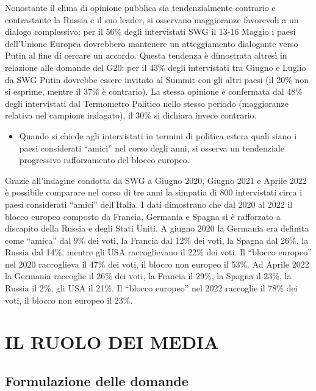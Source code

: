 \documentclass[
]{book}
\providecommand{\tightlist}{%
  \setlength{\itemsep}{0pt}\setlength{\parskip}{0pt}}
\begin{document}
Nonostante il clima di opinione pubblica sia tendenzialmente contrario e contrastante la Russia e il suo leader, si osservano maggioranze favorevoli a un dialogo complessivo: per il 56\% degli intervistati SWG il 13-16 Maggio i paesi dell'Unione Europea dovrebbero mantenere un atteggiamento dialogante verso Putin al fine di cercare un accordo.
Questa tendenza è dimostrata altresì in relazione alle domande del G20: per il 43\% degli intervistati tra Giugno e Luglio da SWG Putin dovrebbe essere invitato al Summit con gli altri paesi (il 20\% non si esprime, mentre il 37\% è contrario). La stessa opinione è confermata dal 48\% degli intervistati dal Termometro Politico nello stesso periodo (maggioranze relativa nel campione indagato), il 30\% si dichiara invece contrario.

\begin{itemize}
\tightlist
\item
  Quando si chiede agli intervistati in termini di politica estera quali siano i paesi considerati ``amici'' nel corso degli anni, si osserva un tendenziale progressivo rafforzamento del blocco europeo.
\end{itemize}

Grazie all'indagine condotta da SWG a Giugno 2020, Giugno 2021 e Aprile 2022 è possibile comparare nel corso di tre anni la simpatia di 800 intervistati circa i paesi considerati ``amici'' dell'Italia. I dati dimostrano che dal 2020 al 2022 il blocco europeo composto da Francia, Germania e Spagna si è rafforzato a discapito della Russia e degli Stati Uniti.
A giugno 2020 la Germania era definita come ``amica'' dal 9\% dei voti, la Francia dal 12\% dei voti, la Spagna dal 26\%, la Russia dal 14\%, mentre gli USA raccoglievano il 22\% dei voti. Il ``blocco europeo'' nel 2020 raccoglieva il 47\% dei voti, il blocco non europeo il 53\%.
Ad Aprile 2022 la Germania raccoglie il 26\% dei voti, la Francia il 29\%, la Spagna il 23\%, la Russia il 2\%, gli USA il 21\%. Il ``blocco europeo'' nel 2022 raccoglie il 78\% dei voti, il blocco non europeo il 23\%.

\hypertarget{il-ruolo-dei-media}{%
\chapter{IL RUOLO DEI MEDIA}\label{il-ruolo-dei-media}}

\hypertarget{formulazione-delle-domande-6}{%
\section{Formulazione delle domande}\label{formulazione-delle-domande-6}}
\end{document}
